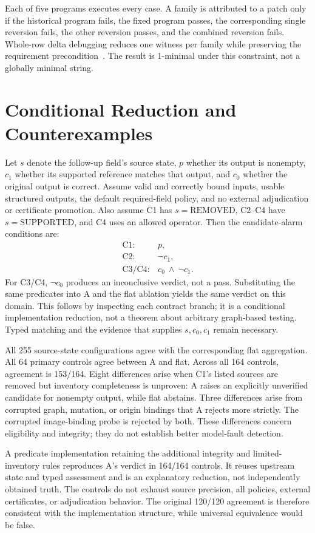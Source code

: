 \documentclass[sigconf,review,anonymous]{acmart}
\begin{document}
Each of five programs executes every case. A family is attributed to a patch only if the historical program fails, the fixed program passes, the corresponding single reversion fails, the other reversion passes, and the combined reversion fails. Whole-row delta debugging reduces one witness per family while preserving the requirement precondition~\cite{zeller2002simplifying}. The result is 1-minimal under this constraint, not a globally minimal string.

\section{Conditional Reduction and Counterexamples}
Let $s$ denote the follow-up field's source state, $p$ whether its output is nonempty, $c_1$ whether its supported reference matches that output, and $c_0$ whether the original output is correct. Assume valid and correctly bound inputs, usable structured outputs, the default required-field policy, and no external adjudication or certificate promotion. Also assume C1 has $s=\mathrm{REMOVED}$, C2--C4 have $s=\mathrm{SUPPORTED}$, and C4 uses an allowed operator. Then the candidate-alarm conditions are:
\[
\begin{array}{ll}
\mathrm{C1}:&p,\\
\mathrm{C2}:&\neg c_1,\\
\mathrm{C3/C4}:&c_0\ \wedge\ \neg c_1.
\end{array}
\]
For C3/C4, $\neg c_0$ produces an inconclusive verdict, not a pass. Substituting the same predicates into A and the flat ablation yields the same verdict on this domain. This follows by inspecting each contract branch; it is a conditional implementation reduction, not a theorem about arbitrary graph-based testing. Typed matching and the evidence that supplies $s,c_0,c_1$ remain necessary.

All 255 source-state configurations agree with the corresponding flat aggregation. All 64 primary controls agree between A and flat. Across all 164 controls, agreement is 153/164. Eight differences arise when C1's listed sources are removed but inventory completeness is unproven: A raises an explicitly unverified candidate for nonempty output, while flat abstains. Three differences arise from corrupted graph, mutation, or origin bindings that A rejects more strictly. The corrupted image-binding probe is rejected by both. These differences concern eligibility and integrity; they do not establish better model-fault detection.

A predicate implementation retaining the additional integrity and limited-inventory rules reproduces A's verdict in 164/164 controls. It reuses upstream state and typed assessment and is an explanatory reduction, not independently obtained truth. The controls do not exhaust source precision, all policies, external certificates, or adjudication behavior. The original 120/120 agreement is therefore consistent with the implementation structure, while universal equivalence would be false.
\end{document}
